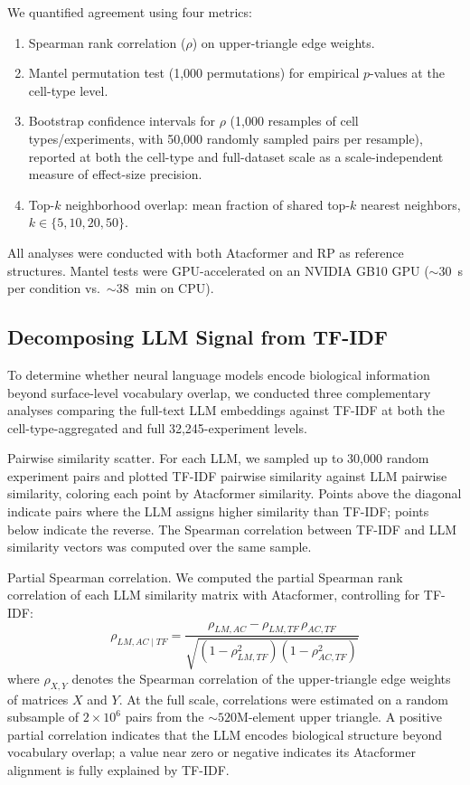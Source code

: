 \documentclass[conference]{IEEEtran}
\begin{document}
We quantified agreement using four metrics:
\begin{enumerate}
  \item Spearman rank correlation ($\rho$) on upper-triangle edge weights.
  \item Mantel permutation test (1,000 permutations) for empirical
        $p$-values at the cell-type level.
  \item Bootstrap confidence intervals for $\rho$ (1,000 resamples
        of cell types/experiments, with 50,000 randomly sampled pairs per
        resample), reported at both the cell-type and full-dataset scale as a
        scale-independent measure of effect-size precision.
  \item Top-$k$ neighborhood overlap: mean fraction of shared top-$k$
        nearest neighbors, $k \in \{5, 10, 20, 50\}$.
\end{enumerate}

All analyses were conducted with both Atacformer and RP as reference
structures. Mantel tests were GPU-accelerated on an NVIDIA GB10 GPU
($\sim$30~s per condition vs.\ $\sim$38~min on CPU).

\subsection{Decomposing LLM Signal from TF-IDF}

To determine whether neural language models encode biological information
beyond surface-level vocabulary overlap, we conducted three complementary
analyses comparing the full-text LLM embeddings against TF-IDF at both the
cell-type-aggregated and full 32,245-experiment levels.

Pairwise similarity scatter. For each LLM, we sampled up to 30,000
random experiment pairs and plotted TF-IDF pairwise similarity against LLM
pairwise similarity, coloring each point by Atacformer similarity. Points
above the diagonal indicate pairs where the LLM assigns higher similarity than
TF-IDF; points below indicate the reverse. The Spearman correlation between
TF-IDF and LLM similarity vectors was computed over the same sample.

Partial Spearman correlation. We computed the partial Spearman
rank correlation of each LLM similarity matrix with Atacformer, controlling
for TF-IDF:
\begin{equation}
  \rho_{LM,AC \mid TF} =
    \frac{\rho_{LM,AC} - \rho_{LM,TF}\,\rho_{AC,TF}}
         {\sqrt{(1-\rho_{LM,TF}^{2})(1-\rho_{AC,TF}^{2})}}
\end{equation}
where $\rho_{X,Y}$ denotes the Spearman correlation of the upper-triangle
edge weights of matrices $X$ and $Y$. At the full scale, correlations were
estimated on a random subsample of $2 \times 10^6$ pairs from the
${\sim}520$M-element upper triangle. A positive partial correlation indicates
that the LLM encodes biological structure beyond vocabulary overlap; a value
near zero or negative indicates its Atacformer alignment is fully explained
by TF-IDF.
\end{document}

